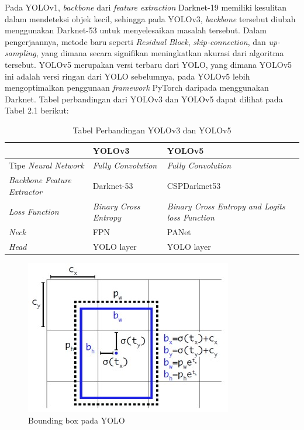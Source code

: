 Pada YOLOv1, \emph{backbone} dari \emph{feature extraction} Darknet-19 memiliki kesulitan dalam mendeteksi objek kecil, sehingga
pada YOLOv3, \emph{backbone} tersebut diubah menggunakan Darknet-53 untuk menyelesaikan masalah tersebut. Dalam pengerjaannya, metode baru seperti \emph{Residual Block}, \emph{skip-connection}, dan \emph{up-sampling}, yang dimana secara signifikan
meningkatkan akurasi dari algoritma tersebut. YOLOv5 merupakan versi terbaru dari YOLO, yang dimana YOLOv5 ini
adalah versi ringan dari YOLO sebelumnya, pada YOLOv5 lebih mengoptimalkan penggunaan \emph{framework} PyTorch daripada menggunakan Darknet. Tabel perbandingan dari YOLOv3 dan YOLOv5 dapat dilihat pada Tabel 2.1 berikut:
\begin{table}
  \caption{Tabel Perbandingan YOLOv3 dan YOLOv5}
  \centering
  \begin{tabular}{|p{4cm}|p{4cm}|p{4cm}|} 
  \cline{2-3}
  \multicolumn{1}{l|}{}              & \textbf{YOLOv3}               & \textbf{YOLOv5}                                         \\ 
  \hline
  Tipe \textit{Neural Network}       & \textit{Fully Convolution}    & \textit{Fully Convolution}                              \\ 
  \hline
  \textit{Backbone Feature Extractor} & Darknet-53                    & CSPDarknet53                                            \\ 
  \hline
  \textit{Loss Function}             & \textit{Binary Cross Entropy} & \textit{Binary Cross Entropy and Logits loss Function}  \\ 
  \hline
  \textit{Neck}                      & FPN                           & PANet                                                   \\ 
  \hline
  \textit{Head}                      & YOLO layer                    & YOLO layer                                              \\
  \hline
  \end{tabular}
\end{table}


\begin{figure}[ht]
  \centering
  \includegraphics[scale=0.7]{gambar/bounding-box.jpg}
  \caption{Bounding box pada YOLO}
  \label{fig:bounding-box}
\end{figure}

